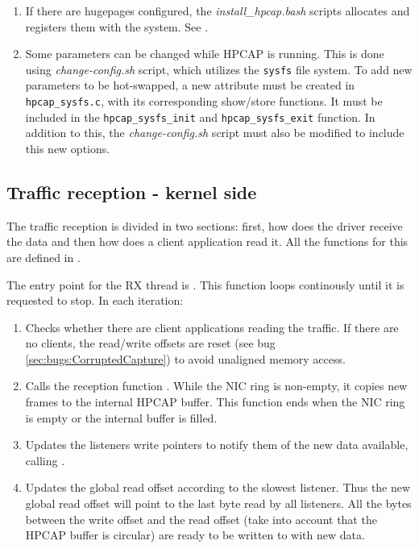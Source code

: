 \documentclass[oneside]{hpman}
\begin{document}
\begin{enumerate}
\item If there are hugepages configured, the \textit{install\_hpcap.bash} scripts allocates and registers them with the system. See .
\item Some parameters can be changed while HPCAP is running. This is done using \textit{change-config.sh} script, which utilizes the \texttt{sysfs} file system. To add new parameters to be hot-swapped, a new attribute must be created in \texttt{hpcap\_sysfs.c}, with its corresponding show/store functions. It must be included in the \texttt{hpcap\_sysfs\_init} and \texttt{hpcap\_sysfs\_exit} function. In addition to this, the \textit{change-config.sh} script must also be modified to include this new options.
\end{enumerate}

\subsection{Traffic reception - kernel side}

The traffic reception is divided in two sections: first, how does the driver receive the data and then how does a client application read it. All the functions for this are defined in .

The entry point for the RX thread is . This function loops continously until it is requested to stop. In each iteration:

\begin{enumerate}
\item Checks whether there are client applications reading the traffic. If there are no clients, the read/write offsets are reset (see bug \ref{sec:bugs:CorruptedCapture}) to avoid unaligned memory access.
\item Calls the reception function . While the NIC ring is non-empty, it copies new frames to the internal HPCAP buffer. This function ends when the NIC ring is empty or the internal buffer is filled.
\item Updates the listeners write pointers to notify them of the new data available, calling .
\item Updates the global read offset according to the slowest listener. Thus the new global read offset will point to the last byte read by all listeners. All the bytes between the write offset and the read offset (take into account that the HPCAP buffer is circular) are ready to be written to with new data.
\end{enumerate}
\end{document}

